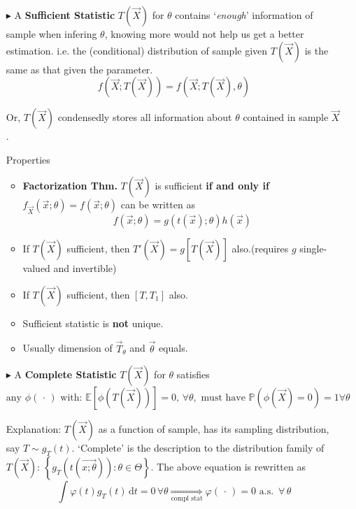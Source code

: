     \begin{itemize}
        \item[$\blacktriangleright$] A \textbf{Sufficient Statistic} $T(\vec{X})$ for $\theta$ contains `\textit{enough}' information of sample when infering $\theta$, knowing more would not help us get a better estimation. i.e. the (conditional) distribution of sample given $ T(\vec{X}) $ is the same as that given the parameter. 
        \begin{equation}
            f(\vec{X};T(\vec{X}))=f(\vec{X};T(\vec{X}),\theta)
        \end{equation}

        Or, $ T(\vec{X}) $ condensedly stores all information about $ \theta  $ contained in sample $ \vec{X} $.

        Properties
        \begin{itemize}
            \item \textbf{Factorization Thm.} $T(\vec{X})$ is sufficient \textbf{if and only if} $f_{\vec{X}}(\vec{x};\theta)=f(\vec{x};\theta)$ can be written as 
            \begin{equation}
                f(\vec{x};\theta)=g\left(t(\vec{x});\theta\right)h(\vec{x})
            \end{equation}            
            \item If $T(\vec{X})$ sufficient, then $T'(\vec{X})=g[T(\vec{X})]$ also.(requires $g$ single-valued and invertible)
            \item If $T(\vec{X})$ sufficient, then $[T,T_1]$ also.
            \item Sufficient statistic is \textbf{not} unique.
            \item Usually dimension of $\vec{T}_\theta$ and $\vec{\theta }$ equals.
        \end{itemize}
        
        
        \item[$\blacktriangleright$] A \textbf{Complete Statistic} $T(\vec{X})$ for $\theta$ satisfies
        \begin{equation}
            \text{any }\phi (\, \cdot \, )\text{ with: }\mathbb{E}\left[ \phi (T(\vec{X})) \right] =0,\,\forall \theta ,\text{ must have } \mathbb{P}\left( \phi (\vec{X}) =0\right) =1\forall \theta  
        \end{equation}

        Explanation: $ T(\vec{X}) $ as a function of sample, has its sampling distribution, say $T\sim g_T(t)$. `Complete' is the description to the distribution family of $ T(\vec{X}) $: $ \left\{g_T\left(t(\vec{x;\theta })\right): \theta \in\Theta \right\} $. The above equation is rewritten as
        \begin{equation}
            \int\varphi (t) g_T(t)\,\mathrm{d} t=0  \,\forall \theta  \mathop{\Rightarrow }\limits_{\text{compl stat}} \varphi(\, \cdot \, )=0 \text{  a.s. }\,\forall\,\theta
        \end{equation}


\end{itemize}
